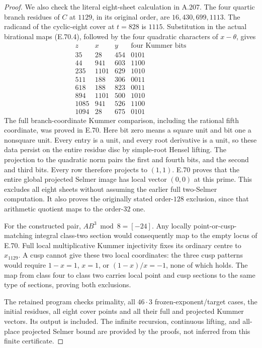 \begin{proof}
We also check the literal eight-sheet calculation in A.207.
The four quartic branch residues of $C$ at $1129$, in its
original order, are $16,430,699,1113$. The radicand of the
cyclic-eight cover at $t=828$ is $1115$. Substitution in the
actual birational maps (E.70.4), followed by the four quadratic
characters of $x-\theta$, gives
\[
\begin{array}{r|r|r|c}
 z&x&y&\text{four Kummer bits}\\\hline
 35&28&454&0101\\
 44&941&603&1100\\
 235&1101&629&1010\\
 511&188&306&0011\\
 618&188&823&0011\\
 894&1101&500&1010\\
 1085&941&526&1100\\
 1094&28&675&0101
\end{array}
\tag{E.83.4}
\]
The full branch-coordinate Kummer comparison, including the
rational fifth coordinate, was proved in E.70. Here bit zero
means a square unit and bit one a nonsquare unit. Every
entry is a unit, and every root derivative is a unit, so
these data persist on the entire residue disc by simple-root
Hensel lifting. The projection to the quadratic norm pairs
the first and fourth bits, and the second and third bits.
Every row therefore projects to $(1,1)$. E.70 proves that
the entire global projected Selmer image has local vector
$(0,0)$ at this prime. This excludes all eight sheets
without assuming the earlier full two-Selmer computation.
It also proves the originally stated order-$128$ exclusion,
since that arithmetic quotient maps to the order-$32$ one.

For the constructed pair, $AB^3\bmod8=[-24]$.
Any locally point-or-cusp-matching integral class-two section
would consequently map to the empty locus of E.70.
Full local multiplicative Kummer injectivity fixes its
ordinary centre to $x_{1129}$. A cusp cannot give these two
local coordinates: the three cusp patterns would require
$1-x=1$, $x=1$, or $(1-x)/x=-1$, none of which holds.
The map from class four to class two carries local point
and cusp sections to the same type of sections, proving
both exclusions.

The retained program 
checks primality, all $46\cdot3$ frozen-exponent/target
cases, the initial residues, all eight cover points and
all their full and projected Kummer vectors. Its output
is included. The infinite recursion, continuous lifting,
and all-place projected Selmer bound are provided by the
proofs, not inferred from this finite certificate.
\end{proof}
